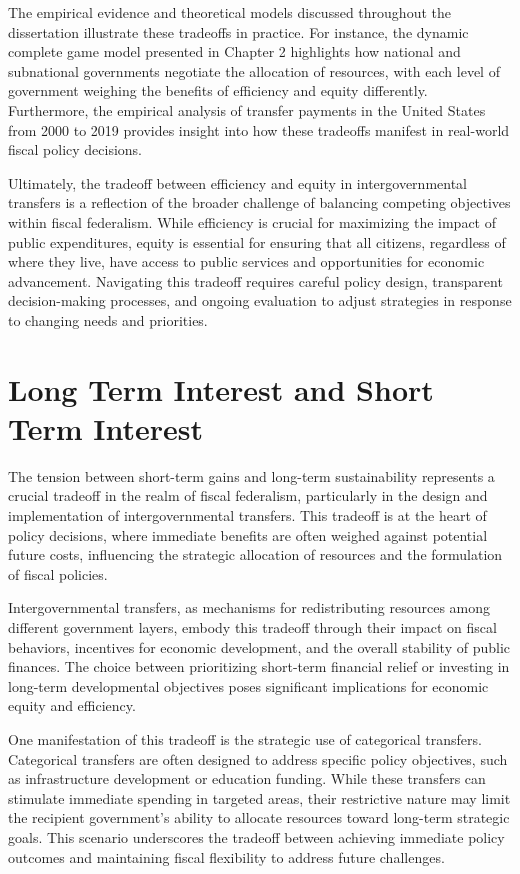 The empirical evidence and theoretical models discussed throughout the dissertation illustrate these tradeoffs in practice. For instance, the dynamic complete game model presented in Chapter 2 highlights how national and subnational governments negotiate the allocation of resources, with each level of government weighing the benefits of efficiency and equity differently. Furthermore, the empirical analysis of transfer payments in the United States from 2000 to 2019 provides insight into how these tradeoffs manifest in real-world fiscal policy decisions.

Ultimately, the tradeoff between efficiency and equity in intergovernmental transfers is a reflection of the broader challenge of balancing competing objectives within fiscal federalism. While efficiency is crucial for maximizing the impact of public expenditures, equity is essential for ensuring that all citizens, regardless of where they live, have access to public services and opportunities for economic advancement. Navigating this tradeoff requires careful policy design, transparent decision-making processes, and ongoing evaluation to adjust strategies in response to changing needs and priorities.



\section{Long Term Interest and Short Term Interest}
The tension between short-term gains and long-term sustainability represents a crucial tradeoff in the realm of fiscal federalism, particularly in the design and implementation of intergovernmental transfers. This tradeoff is at the heart of policy decisions, where immediate benefits are often weighed against potential future costs, influencing the strategic allocation of resources and the formulation of fiscal policies.

Intergovernmental transfers, as mechanisms for redistributing resources among different government layers, embody this tradeoff through their impact on fiscal behaviors, incentives for economic development, and the overall stability of public finances. The choice between prioritizing short-term financial relief or investing in long-term developmental objectives poses significant implications for economic equity and efficiency.

One manifestation of this tradeoff is the strategic use of categorical transfers. Categorical transfers are often designed to address specific policy objectives, such as infrastructure development or education funding. While these transfers can stimulate immediate spending in targeted areas, their restrictive nature may limit the recipient government's ability to allocate resources toward long-term strategic goals. This scenario underscores the tradeoff between achieving immediate policy outcomes and maintaining fiscal flexibility to address future challenges.


